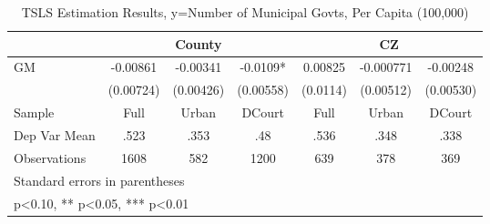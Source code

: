 \begin{table}[htbp]\centering
\def\sym#1{\ifmmode^{#1}\else\(^{#1}\)\fi}
\caption{TSLS Estimation Results, y=Number of Municipal Govts, Per Capita (100,000)}
\begin{tabular}{l*{6}{c}}
\toprule
                &\multicolumn{3}{c}{County}            &\multicolumn{3}{c}{CZ}                \\\cmidrule(lr){2-4}\cmidrule(lr){5-7}
\midrule
GM              & -0.00861   & -0.00341   &  -0.0109*  &  0.00825   &-0.000771   & -0.00248   \\
                &(0.00724)   &(0.00426)   &(0.00558)   & (0.0114)   &(0.00512)   &(0.00530)   \\
\midrule
Sample          &     Full   &    Urban   &   DCourt   &     Full   &    Urban   &   DCourt   \\
Dep Var Mean    &     .523   &     .353   &      .48   &     .536   &     .348   &     .338   \\
Observations    &     1608   &      582   &     1200   &      639   &      378   &      369   \\
\bottomrule
\multicolumn{7}{l}{\footnotesize Standard errors in parentheses}\\
\multicolumn{7}{l}{\footnotesize * p<0.10, ** p<0.05, *** p<0.01}\\
\end{tabular}
\end{table}
